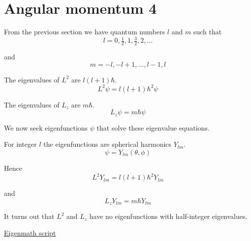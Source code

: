 

\section*{Angular momentum 4}

From the previous section we have quantum numbers $l$ and $m$ such that
\begin{equation*}
l=0,\tfrac{1}{2},1,\tfrac{3}{2},2,\ldots
\end{equation*}

and
\begin{equation*}
m=-l,-l+1,\ldots,l-1,l
\end{equation*}

The eigenvalues of $L^2$ are $l(l+1)\hbar$.
\begin{equation*}
L^2\psi=l(l+1)\hbar^2\psi
\end{equation*}

The eigenvalues of $L_z$ are $m\hbar$.
\begin{equation*}
L_z\psi=m\hbar\psi
\end{equation*}

We now seek eigenfunctions $\psi$ that solve
these eigenvalue equations.

\bigskip
For integer $l$ the eigenfunctions are
spherical harmonics $Y_{lm}$.
\begin{equation*}
\psi=Y_{lm}(\theta,\phi)
\end{equation*}

Hence
\begin{equation*}
L^2Y_{lm}=l(l+1)\hbar^2Y_{lm}
\end{equation*}

and
\begin{equation*}
L_zY_{lm}=m\hbar Y_{lm}
\end{equation*}

It turns out that $L^2$ and $L_z$ have no eigenfunctions with half-integer eigenvalues.

\bigskip
\href{https://georgeweigt.github.io/examples/angular-momentum-4-demo.html}{Eigenmath script}


